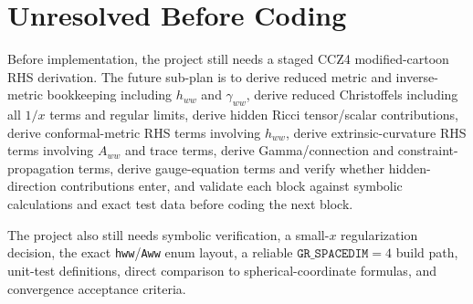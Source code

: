 \documentclass[11pt]{article}
\newcommand{\GRSP}{\texttt{GR\_SPACEDIM}}
\begin{document}
\section{Unresolved Before Coding}

Before implementation, the project still needs a staged CCZ4 modified-cartoon
RHS derivation. The future sub-plan is to derive reduced metric and
inverse-metric bookkeeping including \(h_{ww}\) and \(\gamma_{ww}\), derive
reduced Christoffels including all \(1/x\) terms and regular limits, derive
hidden Ricci tensor/scalar contributions, derive conformal-metric RHS terms
involving \(h_{ww}\), derive extrinsic-curvature RHS terms involving \(A_{ww}\)
and trace terms, derive Gamma/connection and constraint-propagation terms,
derive gauge-equation terms and verify whether hidden-direction contributions
enter, and validate each block against symbolic calculations and exact test
data before coding the next block.

The project also still needs symbolic verification, a small-\(x\)
regularization decision, the exact \texttt{hww}/\texttt{Aww} enum layout, a
reliable \(\GRSP=4\) build path, unit-test definitions, direct comparison to
spherical-coordinate formulas, and convergence acceptance criteria.
\end{document}
